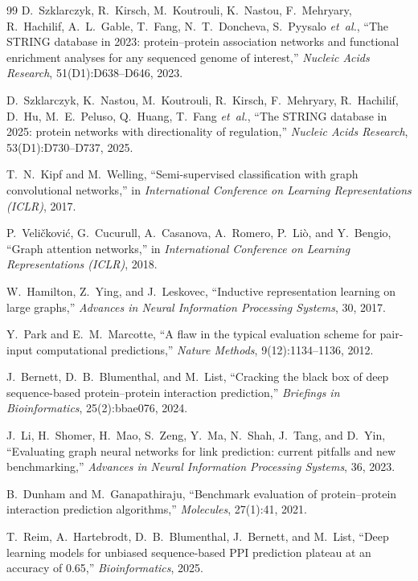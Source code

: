 \documentclass[pdflatex,sn-mathphys-num]{sn-jnl}
\begin{document}
\begin{thebibliography}{99}
D.~Szklarczyk, R.~Kirsch, M.~Koutrouli, K.~Nastou, F.~Mehryary, R.~Hachilif, A.~L.~Gable, T.~Fang, N.~T.~Doncheva, S.~Pyysalo \emph{et~al.},
``The STRING database in 2023: protein--protein association networks and functional enrichment analyses for any sequenced genome of interest,''
\emph{Nucleic Acids Research}, 51(D1):D638--D646, 2023.

D.~Szklarczyk, K.~Nastou, M.~Koutrouli, R.~Kirsch, F.~Mehryary, R.~Hachilif, D.~Hu, M.~E.~Peluso, Q.~Huang, T.~Fang \emph{et~al.},
``The STRING database in 2025: protein networks with directionality of regulation,''
\emph{Nucleic Acids Research}, 53(D1):D730--D737, 2025.

T.~N.~Kipf and M.~Welling,
``Semi-supervised classification with graph convolutional networks,''
in \emph{International Conference on Learning Representations (ICLR)}, 2017.

P.~Veli{\v{c}}kovi{\'c}, G.~Cucurull, A.~Casanova, A.~Romero, P.~Li{\`o}, and Y.~Bengio,
``Graph attention networks,''
in \emph{International Conference on Learning Representations (ICLR)}, 2018.

W.~Hamilton, Z.~Ying, and J.~Leskovec,
``Inductive representation learning on large graphs,''
\emph{Advances in Neural Information Processing Systems}, 30, 2017.

Y.~Park and E.~M.~Marcotte,
``A flaw in the typical evaluation scheme for pair-input computational predictions,''
\emph{Nature Methods}, 9(12):1134--1136, 2012.

J.~Bernett, D.~B.~Blumenthal, and M.~List,
``Cracking the black box of deep sequence-based protein--protein interaction prediction,''
\emph{Briefings in Bioinformatics}, 25(2):bbae076, 2024.

J.~Li, H.~Shomer, H.~Mao, S.~Zeng, Y.~Ma, N.~Shah, J.~Tang, and D.~Yin,
``Evaluating graph neural networks for link prediction: current pitfalls and new benchmarking,''
\emph{Advances in Neural Information Processing Systems}, 36, 2023.

B.~Dunham and M.~Ganapathiraju,
``Benchmark evaluation of protein--protein interaction prediction algorithms,''
\emph{Molecules}, 27(1):41, 2021.

T.~Reim, A.~Hartebrodt, D.~B.~Blumenthal, J.~Bernett, and M.~List,
``Deep learning models for unbiased sequence-based PPI prediction plateau at an accuracy of 0.65,''
\emph{Bioinformatics}, 2025.


\end{thebibliography}
\end{document}
